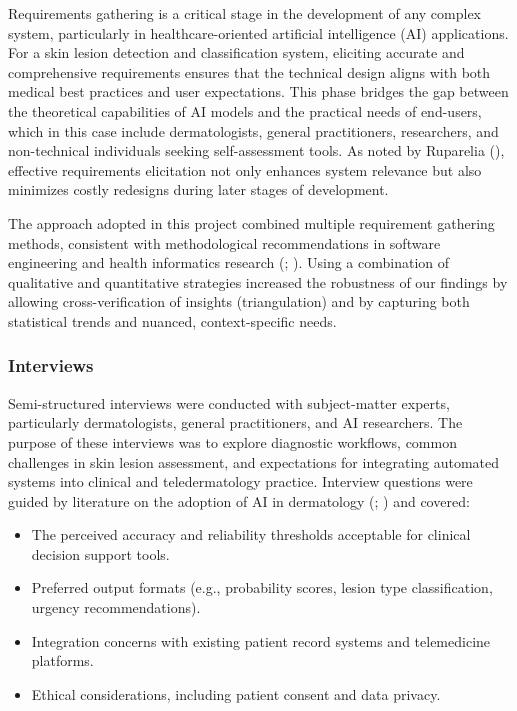 \documentclass[
  12pt,
  oneside]{article}
\providecommand{\tightlist}{%
  \setlength{\itemsep}{0pt}\setlength{\parskip}{0pt}}
\begin{document}
Requirements gathering is a critical stage in the development of any
complex system, particularly in healthcare-oriented artificial
intelligence (AI) applications. For a skin lesion detection and
classification system, eliciting accurate and comprehensive requirements
ensures that the technical design aligns with both medical best
practices and user expectations. This phase bridges the gap between the
theoretical capabilities of AI models and the practical needs of
end-users, which in this case include dermatologists, general
practitioners, researchers, and non-technical individuals seeking
self-assessment tools. As noted by Ruparelia
(), effective
requirements elicitation not only enhances system relevance but also
minimizes costly redesigns during later stages of development.

The approach adopted in this project combined multiple requirement
gathering methods, consistent with methodological recommendations in
software engineering and health informatics research
(;
). Using a combination of
qualitative and quantitative strategies increased the robustness of our
findings by allowing cross-verification of insights (triangulation) and
by capturing both statistical trends and nuanced, context-specific
needs.

\subsubsection{Interviews}\label{interviews}

Semi-structured interviews were conducted with subject-matter experts,
particularly dermatologists, general practitioners, and AI researchers.
The purpose of these interviews was to explore diagnostic workflows,
common challenges in skin lesion assessment, and expectations for
integrating automated systems into clinical and teledermatology
practice. Interview questions were guided by literature on the adoption
of AI in dermatology (; ) and
covered:

\begin{itemize}
\tightlist
\item
  The perceived accuracy and reliability thresholds acceptable for
  clinical decision support tools.
\item
  Preferred output formats (e.g., probability scores, lesion type
  classification, urgency recommendations).
\item
  Integration concerns with existing patient record systems and
  telemedicine platforms.
\item
  Ethical considerations, including patient consent and data privacy.
\end{itemize}
\end{document}

